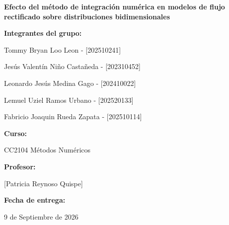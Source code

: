 \documentclass[final,5p,times,twocolumn,authoryear]{elsarticle}
\begin{document}
\begin{titlepage}
    \centering
    \vspace*{2cm} %
    
    {\huge\bfseries Efecto del método de integración numérica en modelos de flujo rectificado sobre distribuciones bidimensionales \par}
    
    \vspace{2.5cm}
    
    {\Large\textbf{Integrantes del grupo:}\par}
    \vspace{0.5cm}
    {\large
    Tommy Bryan Loo Leon - [202510241]  \par
    Jesús Valentín Niño Castañeda - [202310452]  \par
    Leonardo Jesús Medina Gago - [202410022] \par
    Lemuel Uziel Ramos Urbano - [202520133]  \par
    Fabricio Joaquin Rueda Zapata - [202510114]  \par
    }
    
    \vspace{2.5cm}
    
    {\Large\textbf{Curso:}\par}
    {\large CC2104 Métodos Numéricos \par}
    
    \vspace{2cm}
    
    {\Large\textbf{Profesor:}\par}
    {\large [Patricia Reynoso Quispe] \par}
    
    \vfill
    
    {\Large\textbf{Fecha de entrega:}\par}
    {\large 9 de Septiembre de 2026 \par}
    
    \vspace*{2cm}
\end{titlepage}
\end{document}

